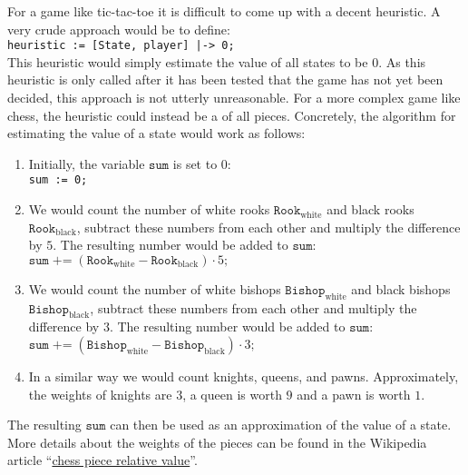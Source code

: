 For a game like tic-tac-toe it is difficult to come up with a decent heuristic.  A very crude approach would be
to define:
\\[0.2cm]
\hspace*{1.3cm}
\texttt{heuristic := [State, player] |-> 0;}
\\[0.2cm]
This heuristic would simply estimate the value of all states to be $0$.  As this heuristic is only called after
it has been tested that the game has not yet been decided, this approach is not utterly unreasonable.  For a more
complex game like chess, the heuristic could instead be a  of all pieces.  Concretely, the
algorithm for estimating the value of a state would work as follows:
\begin{enumerate}
\item Initially, the variable $\texttt{sum}$ is set to $0$:
      \\[0.2cm]
      \hspace*{1.3cm}
      \texttt{sum := 0;}
\item We would count the number of white rooks $\texttt{Rook}_{\mathrm{white}}$ and black rooks $\texttt{Rook}_{\mathrm{black}}$,
      subtract these numbers from each other and multiply the difference by $5$.  
      The resulting number would be added to $\texttt{sum}$:
      \\[0.2cm]
      \hspace*{1.3cm}
      $\texttt{sum} \;\texttt{+=}\; (\texttt{Rook}_{\mathrm{white}} - \texttt{Rook}_{\mathrm{black}}) \cdot 5\texttt{;}$
\item We would count the number of white bishops $\texttt{Bishop}_{\mathrm{white}}$ and black bishops
      $\texttt{Bishop}_{\mathrm{black}}$,
      subtract these numbers from each other and multiply the difference by $3$.  
      The resulting number would be added to $\texttt{sum}$:
      \\[0.2cm]
      \hspace*{1.3cm}
      $\texttt{sum} \;\texttt{+=}\; (\texttt{Bishop}_{\mathrm{white}} - \texttt{Bishop}_{\mathrm{black}}) \cdot 3\texttt{;}$
\item In a similar way we would count knights, queens, and pawns.  Approximately, the weights of
      knights are $3$, a queen is worth $9$ and a pawn is worth $1$.
\end{enumerate}
The resulting $\texttt{sum}$ can then be used as an approximation of the value of a state.
More details about the weights of the pieces can be found in the Wikipedia article 
``\href{https://en.wikipedia.org/wiki/Chess_piece_relative_value}{chess piece relative value}''.



